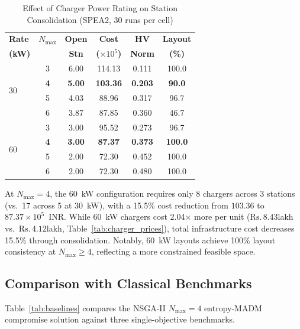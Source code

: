 \documentclass[conference]{IEEEtran}
\newcommand{\Rs}[1]{\ensuremath{\mathrm{Rs}{.}\,#1}}
\begin{document}
\begin{table}[htbp]
\caption{Effect of Charger Power Rating on Station Consolidation (SPEA2, 30 runs per cell)}
\label{tab:charger_rate}
\centering
\renewcommand{\arraystretch}{1.20}
\begin{tabular}{@{}lccccc@{}}
\toprule
\textbf{Rate} & \textbf{$N_{\max}$} & \textbf{Open} & \textbf{Cost} & \textbf{HV} & \textbf{Layout} \\
\textbf{(kW)} & & \textbf{Stn} & \textbf{($\times 10^5$)} & \textbf{Norm} & \textbf{(\%)} \\
\midrule
\multirow{4}{*}{30} & 3 & 6.00 & 114.13 & 0.111 & 100.0 \\
 & \textbf{4} & \textbf{5.00} & \textbf{103.36} & \textbf{0.203} & \textbf{90.0} \\
 & 5 & 4.03 & 88.96 & 0.317 & 96.7 \\
 & 6 & 3.87 & 87.85 & 0.360 & 46.7 \\
\midrule
\multirow{4}{*}{60} & 3 & 3.00 & 95.52 & 0.273 & 96.7 \\
 & \textbf{4} & \textbf{3.00} & \textbf{87.37} & \textbf{0.373} & \textbf{100.0} \\
 & 5 & 2.00 & 72.30 & 0.452 & 100.0 \\
 & 6 & 2.00 & 72.30 & 0.480 & 100.0 \\
\bottomrule
\end{tabular}
\end{table}

At $N_{\max} = 4$, the 60~kW configuration requires only 8 chargers across 3 stations (vs.\ 17 across 5 at 30~kW), with a 15.5\% cost reduction from $103.36$ to $87.37 \times 10^5$~INR. While 60~kW chargers cost 2.04$\times$ more per unit (\Rs{8.43}{lakh} vs.\ \Rs{4.12}{lakh}, Table~\ref{tab:charger_prices}), total infrastructure cost decreases 15.5\% through consolidation. Notably, 60~kW layouts achieve 100\% layout consistency at $N_{\max} \geq 4$, reflecting a more constrained feasible space.

\subsection{Comparison with Classical Benchmarks}

Table~\ref{tab:baselines} compares the NSGA-II $N_{\max}=4$ entropy-MADM compromise solution against three single-objective benchmarks.
\end{document}
